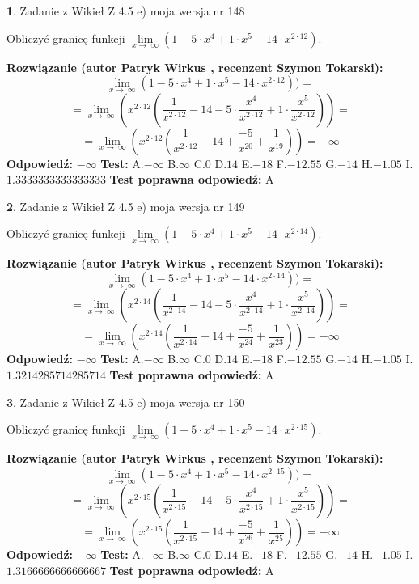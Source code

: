 \documentclass[12pt, a4paper]{article}
\theoremstyle{definition} %
\newtheorem{zad}{}
\newcommand{\zadStart}[1]{\begin{zad}#1\newline}
\newcommand{\zadStop}{\end{zad}}
\newcommand{\rozwStart}[2]{\noindent \textbf{Rozwiązanie (autor #1 , recenzent #2): }\newline}
\newcommand{\rozwStop}{\newline}
\newcommand{\odpStart}{\noindent \textbf{Odpowiedź:}\newline}
\newcommand{\odpStop}{\newline}
\newcommand{\testStart}{\noindent \textbf{Test:}\newline}
\newcommand{\testStop}{\newline}
\newcommand{\kluczStart}{\noindent \textbf{Test poprawna odpowiedź:}\newline}
\newcommand{\kluczStop}{\newline}
\begin{document}
\zadStart{Zadanie z Wikieł Z 4.5 e) moja wersja nr 148}


Obliczyć granicę funkcji  $\lim\limits_{x\to\ \infty}(1 - 5 \cdot x^{4}+1 \cdot x^{5}- 14 \cdot x^{2\cdot12})$.
\zadStop
\rozwStart{Patryk Wirkus}{Szymon Tokarski}
$$\lim\limits_{x\to\ \infty}(1 - 5 \cdot x^{4}+1 \cdot x^{5}- 14 \cdot x^{2\cdot12}))=$$
$$=\lim\limits_{x\to\ \infty}(x^{2\cdot12}(\frac{1}{x^{2\cdot12}}-14 -5 \cdot \frac{x^{4}}{x^{2\cdot12}}+1 \cdot \frac{x^{5}}{x^{2\cdot12}}))=$$
$$=\lim\limits_{x\to\ \infty}(x^{2\cdot12}(\frac{1}{x^{2\cdot12}}-14 + \frac{-5}{x^{20}}+ \frac{1}{x^{19}}))=-\infty$$
\rozwStop
\odpStart
$-\infty$
\odpStop
\testStart
A.$-\infty$ B.$\infty$ C.$0$ D.$14$ E.$-18$
F.$-12.55$ G.$-14$
H.$-1.05$
I.$1.3333333333333333$
\testStop
\kluczStart
A
\kluczStop



\zadStart{Zadanie z Wikieł Z 4.5 e) moja wersja nr 149}


Obliczyć granicę funkcji  $\lim\limits_{x\to\ \infty}(1 - 5 \cdot x^{4}+1 \cdot x^{5}- 14 \cdot x^{2\cdot14})$.
\zadStop
\rozwStart{Patryk Wirkus}{Szymon Tokarski}
$$\lim\limits_{x\to\ \infty}(1 - 5 \cdot x^{4}+1 \cdot x^{5}- 14 \cdot x^{2\cdot14}))=$$
$$=\lim\limits_{x\to\ \infty}(x^{2\cdot14}(\frac{1}{x^{2\cdot14}}-14 -5 \cdot \frac{x^{4}}{x^{2\cdot14}}+1 \cdot \frac{x^{5}}{x^{2\cdot14}}))=$$
$$=\lim\limits_{x\to\ \infty}(x^{2\cdot14}(\frac{1}{x^{2\cdot14}}-14 + \frac{-5}{x^{24}}+ \frac{1}{x^{23}}))=-\infty$$
\rozwStop
\odpStart
$-\infty$
\odpStop
\testStart
A.$-\infty$ B.$\infty$ C.$0$ D.$14$ E.$-18$
F.$-12.55$ G.$-14$
H.$-1.05$
I.$1.3214285714285714$
\testStop
\kluczStart
A
\kluczStop



\zadStart{Zadanie z Wikieł Z 4.5 e) moja wersja nr 150}


Obliczyć granicę funkcji  $\lim\limits_{x\to\ \infty}(1 - 5 \cdot x^{4}+1 \cdot x^{5}- 14 \cdot x^{2\cdot15})$.
\zadStop
\rozwStart{Patryk Wirkus}{Szymon Tokarski}
$$\lim\limits_{x\to\ \infty}(1 - 5 \cdot x^{4}+1 \cdot x^{5}- 14 \cdot x^{2\cdot15}))=$$
$$=\lim\limits_{x\to\ \infty}(x^{2\cdot15}(\frac{1}{x^{2\cdot15}}-14 -5 \cdot \frac{x^{4}}{x^{2\cdot15}}+1 \cdot \frac{x^{5}}{x^{2\cdot15}}))=$$
$$=\lim\limits_{x\to\ \infty}(x^{2\cdot15}(\frac{1}{x^{2\cdot15}}-14 + \frac{-5}{x^{26}}+ \frac{1}{x^{25}}))=-\infty$$
\rozwStop
\odpStart
$-\infty$
\odpStop
\testStart
A.$-\infty$ B.$\infty$ C.$0$ D.$14$ E.$-18$
F.$-12.55$ G.$-14$
H.$-1.05$
I.$1.3166666666666667$
\testStop
\kluczStart
A
\kluczStop
\end{document}
